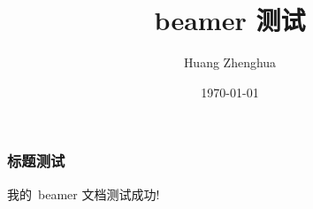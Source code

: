 \documentclass{beamer}
\begin{document}
    \title{beamer 测试}
    \author{Huang Zhenghua}
    \date{\today}
    \frame{\titlepage}
\begin{frame}\frametitle{标题测试}
我的~beamer 文档测试成功!
\end{frame}
\end{document}
